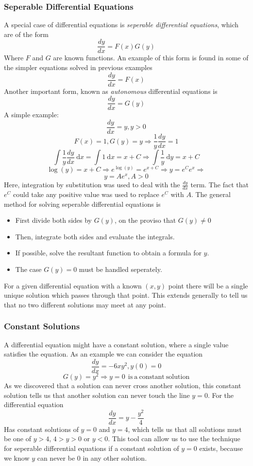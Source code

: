 \documentclass[12pt]{report}
\newcommand{\dx}{\:\mathrm{d}x}
\newcommand{\dy}{\:\mathrm{d}y}
\begin{document}
\begin{flushleft}
\subsubsection*{Seperable Differential Equations}
A special case of differential equations is \textit{seperable differential 
equations}, which are of the form
\[\frac{dy}{dx} = F(x)G(y)\]
Where \(F\) and \(G\) are known functions. An example of this form is found in
some of the simpler equations solved in previous examples
\[\frac{dy}{dx} = F(x)\]
Another important form, known as \textit{autonomous} differential equations is
\[\frac{dy}{dx} = G(y)\]
A simple example:
\[\frac{dy}{dx} = y, y > 0\]
\[F(x) = 1, G(y) = y \Rightarrow \frac{1}{y}\frac{dy}{dx} = 1\]
\[\int \frac{1}{y}\frac{dy}{dx} \dx = \int 1 \dx = x + C \Rightarrow
\int \frac{1}{y} \dy = x + C\]
\[\log(y) = x + C \Rightarrow e^{\log(y)} = e^{x + C} \Rightarrow y = e^Ce^x
\Rightarrow\]
\[y = Ae^x, A > 0\]
Here, integration by substitution was used to deal with the \(\frac{dy}{dx}\)
term. The fact that \(e^C\) could take any positive value was used to replace
\(e^C\) with \(A\). The general method for solving seperable differential 
equations is
\begin{itemize}
    \item First divide both sides by \(G(y)\), on the proviso that 
    \(G(y)\neq 0\)
    \item Then, integrate both sides and evaluate the integrals.
    \item If possible, solve the resultant function to obtain a formula for 
    \(y\).
    \item The case \(G(y) = 0\) must be handled seperately.
\end{itemize}
For a given differential equation with a known \((x, y)\) point there will be
a single unique solution which passes through that point. This extends 
generally to tell us that no two different solutions may meet at any point.

\subsubsection*{Constant Solutions}
A differential equation might have a constant solution, where a single value
satisfies the equation. As an example we can consider the equation
\[\frac{dy}{dx} = -6xy^2, y(0) = 0\]
\[G(y) = y^2 \Rightarrow y = 0 \mathrm{\:\:is\:a\:constant\:solution}\]
As we discovered that a solution can never cross another solution, this 
constant solution tells us that another solution can never touch the line
\(y = 0\). For the differential equation
\[\frac{dy}{dx} = y - \frac{y^2}{4}\]
Has constant solutions of \(y = 0\) and \(y = 4\), which tells us that 
all solutions must be one of \(y > 4\), \(4 > y > 0\) or \(y < 0\). This
tool can allow us to use the technique for seperable differential equations
if a constant solution of \(y = 0\) exists, because we know \(y\) can never
be \(0\) in any other solution.


\end{flushleft}
\end{document}
